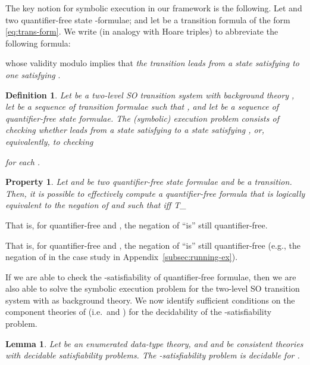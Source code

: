 \documentclass[conference]{IEEEtran}
\newtheorem{definition}{Definition}
\newtheorem{lemma}{Lemma}
\newtheorem{property}{Property}
\newcommand{\close}{\IEEEQEDclosed}
\begin{document}
The key notion for symbolic execution in our framework is the following. Let  and  two quantifier-free state -formulae; and let  be a transition formula of the form \eqref{eq:trans-form}.  We write  (in analogy with Hoare triples) to abbreviate the following formula:

whose validity modulo  implies that \emph{the transition  leads 
 from a state satisfying  to one satisfying }.
\begin{definition}
  Let  be a two-level SO
  transition system with background theory , let 
  be a sequence of transition formulae such that , and let
   be a sequence of quantifier-free state
  formulae. The \emph{(symbolic) execution problem} consists of
  checking whether  leads  from a state
  satisfying  to a state satisfying , or,
  equivalently, to checking
  
  for each . \hfill \close
\end{definition}

\begin{property}
  \label{prop:pre-comp-se}
  Let  and  be two quantifier-free state formulae and
   be a transition.  Then, it is possible to effectively compute
  a quantifier-free formula  that is logically equivalent to the
  negation of  and such that
   iff T_ \hfill \close
\end{property}

\begin{SHORT}
  That is, for quantifier-free  and , the negation of
   ``is'' still quantifier-free.
\end{SHORT}
\begin{LONG}
  That is, for quantifier-free  and , the negation of
   ``is'' still quantifier-free (e.g.,
  the negation of  in the case study in Appendix~\ref{subsec:running-ex}).
\end{LONG}

If we are able to check the -satisfiability of
quantifier-free formulae, then we are also able to solve the symbolic
execution problem for the two-level SO transition system with
 as background theory. We now identify sufficient
conditions on the component theories of  (i.e.\
 and ) for the
decidability of the -satisfiability problem.
\begin{lemma}
  \label{th:dec-SOA-sat}
  Let  be an enumerated data-type theory, and  and  be consistent theories with
  decidable satisfiability problems.  The -satisfiability
  problem is decidable for .
  \hfill \close
\end{lemma}
\end{document}
